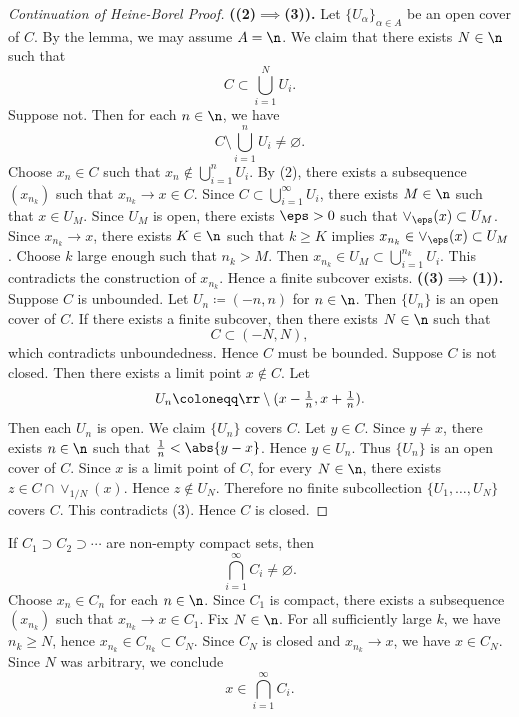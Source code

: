 

\begin{proof}[Continuation of Heine-Borel Proof]
	\textbf{((2)$\implies$(3)).}
    Let $\{U_\alpha\}_{\alpha\in A}$ be an open cover of $C$.
    By the lemma, we may assume $A = \n$.
    We claim that there exists $N\in\n$ such that
    \[
        C\subset \bigcup_{i=1}^N U_i.
    \]
    Suppose not.
    Then for each $n\in\n$, we have
    \[
        C\setminus\bigcup_{i=1}^n U_i \neq \varnothing.
    \]
    Choose $x_n\in C$ such that $x_n\notin\bigcup_{i=1}^n U_i$.
    By (2), there exists a subsequence $(x_{n_k})$ such that $x_{n_k}\to x\in C$.
    Since $C\subset \bigcup_{i=1}^\infty U_i$, there exists $M\in\n$ such that $x\in U_M$.
    Since $U_M$ is open, there exists $\eps > 0$ such that $\vee_\eps(x)\subset U_M$.
    Since $x_{n_k}\to x$, there exists $K\in\n$ such that $k\geq K$ implies $x_{n_k}\in \vee_\eps(x)\subset U_M$.
    Choose $k$ large enough such that $n_k > M$.
    Then $x_{n_k}\in U_M \subset \bigcup_{i=1}^{n_k} U_i$.
    This contradicts the construction of $x_{n_k}$.
    Hence a finite subcover exists.
    \textbf{((3)$\implies$(1)).}
    Suppose $C$ is unbounded.
    Let $U_n \coloneqq (-n,n)$ for $n\in\n$.
    Then $\{U_n\}$ is an open cover of $C$.
    If there exists a finite subcover, then there exists $N\in\n$ such that
    \[
        C\subset (-N,N),
    \]
    which contradicts unboundedness.
    Hence $C$ must be bounded.
    Suppose $C$ is not closed.
    Then there exists a limit point $x\notin C$.
    Let
    \[
        U_n \coloneqq \rr\setminus (x - \tfrac{1}{n}, x + \tfrac{1}{n}).
    \]
    Then each $U_n$ is open.
    We claim $\{U_n\}$ covers $C$.
    Let $y\in C$.
    Since $y\neq x$, there exists $n\in\n$ such that $\tfrac{1}{n} < \abs{y-x}$.
    Hence $y\in U_n$.
    Thus $\{U_n\}$ is an open cover of $C$.
    Since $x$ is a limit point of $C$, for every $N\in\n$, there exists $z\in C\cap \vee_{1/N}(x)$.
    Hence $z\notin U_N$.
    Therefore no finite subcollection $\{U_1,\ldots,U_N\}$ covers $C$.
    This contradicts (3).
    Hence $C$ is closed.
\end{proof}

\begin{theorem}{
    If $C_1\supset C_2\supset\cdots$ are non-empty compact sets, then
    \[
        \bigcap_{i=1}^\infty C_i \neq \varnothing.
    \]
}
    Choose $x_n\in C_n$ for each $n\in\n$.
    Since $C_1$ is compact, there exists a subsequence $(x_{n_k})$ such that $x_{n_k}\to x\in C_1$.
    Fix $N\in\n$.
    For all sufficiently large $k$, we have $n_k\geq N$, hence $x_{n_k}\in C_{n_k}\subset C_N$.
    Since $C_N$ is closed and $x_{n_k}\to x$, we have $x\in C_N$.
    Since $N$ was arbitrary, we conclude
    \[
        x\in \bigcap_{i=1}^\infty C_i.
    \]
\end{theorem}